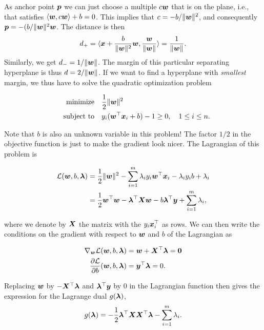 As anchor point $\bm{p}$ we can just choose a multiple $c\bm{w}$ that is on the plane, i.e., that satisfies $\langle {\bm{w}}, {c\bm{w}} \rangle+b=0$. This implies that $c=-b/\Vert {\bm{w}}\Vert^2$, and consequently $\bm{p} = -(b/\Vert {\bm{w}}\Vert^2 \bm{w}$. The distance is then
\begin{equation*}
  d_+ = \langle {\bm{x}+\frac{b}{\Vert {\bm{w}}\Vert^2}\bm{w}}, {\frac{\bm{w}}{\Vert {\bm{w}}\Vert}} \rangle = \frac{1}{\Vert {\bm{w}}\Vert}.
\end{equation*}
Similarly, we get $d_-=1/\Vert {\bm{w}}\Vert$. The margin of this particular separating hyperplane is thus $d=2/\Vert {\bm{w}}\Vert$. If we want to find a hyperplane with {\em smallest} margin, we thus have to solve the quadratic optimization problem

\begin{align*}
\text{minimize}\quad & \frac{1}{2}\Vert {\bm{w}}\Vert^2\\
\quad\text{subject to}\quad & y_i(\bm{w}^{\top}\bm{x}_i+b)-1 \geq 0, \quad 1\leq i\leq n.
\end{align*}

Note that $b$ is also an unknown variable in this problem! 
The factor $1/2$ in the objective function is just to make the gradient look nicer. The Lagrangian of this problem is

\begin{align*}
\mathcal{L}(\bm{w},b,\bm{\lambda}) &= \frac{1}{2}\Vert {\bm{w}}\Vert^2 - \sum_{i=1}^m \lambda_i y_i \bm{w}^{\top}\bm{x}_i-\lambda_iy_ib+\lambda_i\\
&= \frac{1}{2}\bm{w}^{\top}\bm{w}-\bm{\lambda}^{\top}\bm{X}\bm{w}-b\bm{\lambda}^{\top}\bm{y}+\sum_{i=1}^m \lambda_i,
\end{align*}
 
where we denote by $\bm{X}$ the matrix with the $y_i\bm{x}_i^{\top}$ as rows. We can then write the conditions on the gradient with respect to $\bm{w}$ and $b$ of the Lagrangian as

\begin{align}\label{eq:lagrange-grad}
\begin{split}
 \nabla_{\bm{w}} \mathcal{L}(\bm{w},b,\bm{\lambda}) & = \bm{w}+\bm{X}^{\top}\bm{\lambda} = \bm{0} \\
 \frac{\partial \mathcal{L}}{\partial b}(\bm{w},b,\bm{\lambda}) &= \bm{y}^{\top}\bm{\lambda} = 0.
 \end{split}
\end{align}

Replacing $\bm{w}$ by $-\bm{X}^{\top}\bm{\lambda}$ and $\bm{\lambda}^{\top}\bm{y}$ by $0$ in the Lagrangian function then gives the expression for the Lagrange dual $g(\bm{\lambda})$,
\begin{equation*}
  g(\bm{\lambda}) = -\frac{1}{2}\bm{\lambda}^{\top}\bm{X}\bm{X}^{\top}\bm{\lambda}-\sum_{i=1}^m \lambda_i.
\end{equation*}

